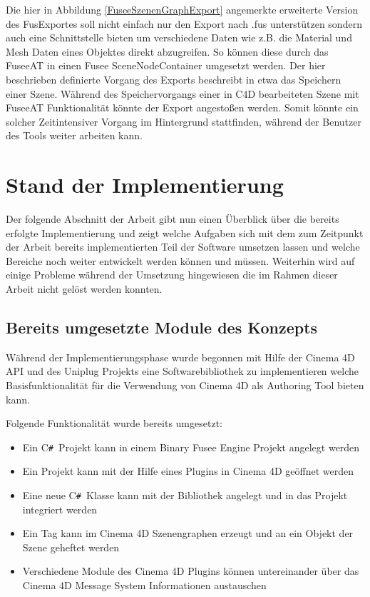 \documentclass[pagesize, paper=a4, fontsize=12pt, titlepage=true, headings=small, headnosepline, abstractoff, liststotoc, nochapterprefix, plainheadsepline, twoside]{scrreprt}
\newcommand{\CSS}{C\texttt{\# }}
\begin{document}
Die hier in Abbildung \ref{FuseeSzenenGraphExport} angemerkte erweiterte Version des FusExportes soll nicht einfach nur den Export nach .fus unterstützen sondern auch eine Schnittstelle bieten um verschiedene Daten wie z.B. die Material und Mesh Daten eines Objektes direkt abzugreifen. So können diese durch das FuseeAT in einen Fusee SceneNodeContainer umgesetzt werden.
Der hier beschrieben definierte Vorgang des Exports beschreibt in etwa das Speichern einer Szene. Während des Speichervorgangs einer in C4D bearbeiteten Szene mit FuseeAT Funktionalität könnte der Export angestoßen werden. Somit könnte ein solcher Zeitintensiver Vorgang im Hintergrund stattfinden, während der Benutzer des Tools weiter arbeiten kann.

\section{Stand der Implementierung}
Der folgende Abschnitt der Arbeit gibt nun einen Überblick über die bereits erfolgte Implementierung und zeigt welche Aufgaben sich mit dem zum Zeitpunkt der Arbeit bereits implementierten Teil der Software umsetzen lassen und welche Bereiche noch weiter entwickelt werden können und müssen. Weiterhin wird auf einige Probleme während der Umsetzung hingewiesen die im Rahmen dieser Arbeit nicht gelöst werden konnten.

\subsection{Bereits umgesetzte Module des Konzepts}
Während der Implementierungsphase wurde begonnen mit Hilfe der Cinema 4D API und des Uniplug Projekts eine Softwarebibliothek zu implementieren welche Basisfunktionalität für die Verwendung von Cinema 4D als Authoring Tool bieten kann. 

Folgende Funktionalität wurde bereits umgesetzt:
\begin{itemize}
\item Ein \CSS Projekt kann in einem Binary Fusee Engine Projekt angelegt werden
\item Ein Projekt kann mit der Hilfe eines Plugins in Cinema 4D geöffnet werden
\item Eine neue \CSS Klasse kann mit der Bibliothek angelegt und in das Projekt integriert werden
\item Ein Tag kann im Cinema 4D Szenengraphen erzeugt und an ein Objekt der Szene geheftet werden
\item Verschiedene Module des Cinema 4D Plugins können untereinander über das Cinema 4D Message System Informationen austauschen
\end{itemize}
\end{document}
